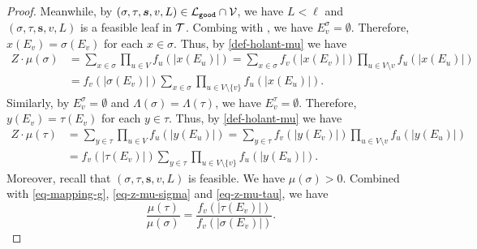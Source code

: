 \documentclass[11pt]{article}
\newtheorem{corollary}[theorem]{Corollary}
\newcommand{\abs}[1]{\left\vert#1\right\vert}
\def\!#1{\mathtt{#1}}
\newcommand{\seqS}{\boldsymbol{s}}
\begin{document}
\begin{proof}
    Meanwhile, by $(\sigma, \tau, \seqS,v,L) \in \+L_{\!{good}}\cap \+V$, 
    we have $L<\ell$ and $(\sigma, \tau, \seqS,v,L)$ is a feasible leaf in $\mathcal{T}$.
    Combing with ,
    we have $E_v^{\sigma} = \emptyset$. 
    Therefore, $x(E_v) = \sigma(E_v)$ for each $x\in \sigma$.
    Thus, by \eqref{def-holant-mu} we have
    \begin{equation}\label{eq-z-mu-sigma}
    \begin{aligned}
        Z\cdot \mu(\sigma)&= \sum_{x\in \sigma} \prod_{u \in V} f_u\left(\abs{x ({E_u})}\right)=\sum_{x\in \sigma} f_v\left(\abs{x ({E_v})}\right)\prod_{u \in V\setminus v} f_u\left(\abs{x ({E_u})}\right)\\
        &=f_v\left(\abs{\sigma ({E_v})}\right)\sum_{x\in \sigma} \prod_{u \in V\setminus \{v\}} f_u\left(\abs{x ({E_u})}\right).
    \end{aligned}
    \end{equation}
    Similarly, by $E_v^{\sigma} = \emptyset$ and $\Lambda(\sigma) = \Lambda(\tau)$, we have $E_v^{\tau} = \emptyset$. 
    Therefore, $y(E_v) = \tau(E_v)$ for each $y\in \tau$.
    Thus, by \eqref{def-holant-mu} we have 
    \begin{equation}\label{eq-z-mu-tau}
      \begin{aligned}
        Z\cdot\mu(\tau)&= \sum_{y\in \tau} \prod_{u \in V} f_u\left(\abs{y ({E_u})}\right)=\sum_{y\in \tau} f_v\left(\abs{y ({E_v})}\right)\prod_{u \in V\setminus v} f_u\left(\abs{y ({E_u})}\right)\\
        &=f_v\left(\abs{\tau ({E_v})}\right)\sum_{y\in \tau} \prod_{u \in V\setminus \{v\}} f_u\left(\abs{y ({E_u})}\right).
    \end{aligned}
    \end{equation}
    Moreover, recall that $(\sigma,\tau,\seqS,v,L)$ is feasible.
    We have $\mu(\sigma)>0$. Combined with \eqref{eq-mapping-g}, \eqref{eq-z-mu-sigma} and \eqref{eq-z-mu-tau}, we have
    $$
        \frac{\mu(\tau)}{\mu(\sigma)} =  \frac{f_v\left(\abs{\tau(E_v)}\right)}{f_v\left(\abs{\sigma({E_v})}\right)}.
    $$
\end{proof}


\end{document}
